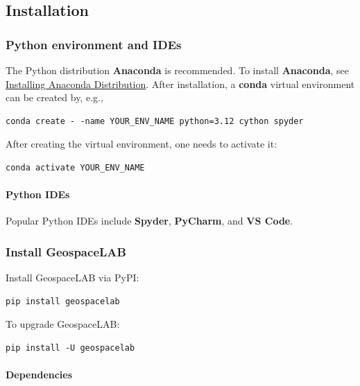 \subsection{Installation}

\subsubsection{Python environment and IDEs}

The Python distribution \textbf{Anaconda} is recommended. To install \textbf{Anaconda}, see \href{https://www.anaconda.com/docs/getting-started/anaconda/install/overview}{Installing Anaconda Distribution}. After installation, a \textbf{conda} virtual environment can be created by, e.g.,

\begin{verbatim}
conda create - -name YOUR_ENV_NAME python=3.12 cython spyder
\end{verbatim}

After creating the virtual environment, one needs to activate it:

\begin{verbatim}
conda activate YOUR_ENV_NAME
\end{verbatim}

\paragraph{Python IDEs}

Popular Python IDEs include \textbf{Spyder}, \textbf{PyCharm}, and \textbf{VS Code}.

\subsubsection{Install GeospaceLAB}

Install GeospaceLAB via PyPI:

\begin{verbatim}
pip install geospacelab
\end{verbatim}

To upgrade GeospaceLAB:

\begin{verbatim}
pip install -U geospacelab
\end{verbatim}

\paragraph{Dependencies}

